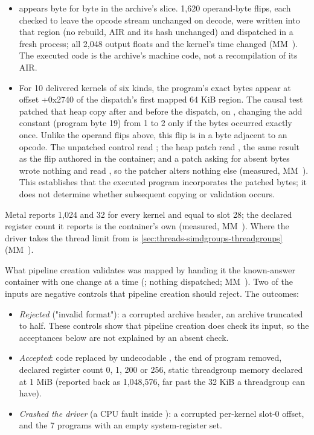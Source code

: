 \begin{itemize}
\item {} appears byte for byte in the archive's  slice. 1,620 operand-byte flips, each checked to
  leave the opcode stream unchanged on decode, were written into that region (no rebuild, AIR and its hash unchanged) and
  dispatched in a fresh process; all 2,048 output floats and the kernel's time changed (MM~). The executed code
  is the archive's machine code, not a recompilation of its AIR.
\item For 10 delivered kernels of six kinds, the program's exact bytes appear at offset +0x2740 of the dispatch's first
  mapped 64 KiB region. The causal test patched that heap copy after  and before the dispatch,
  on , changing the add constant (program byte 19) from 1 to 2 only if the bytes occurred exactly once.
  Unlike the operand flips above, this flip is in a byte adjacent to an opcode.
  The unpatched control read ; the heap patch read , the same result as the flip authored in the
  container; and a patch asking for absent bytes wrote nothing and read , so the patcher alters nothing else
  (measured, MM~). This establishes that the executed program incorporates the patched bytes; it does not determine
  whether subsequent copying or validation occurs.
\end{itemize}

Metal reports  1,024 and  32 for every kernel and
 equal to slot 28; the declared register count it reports is the container's own
(measured, MM~). Where the driver takes the thread limit from is \cref{sec:threads-simdgroups-threadgroups} (MM~).

What pipeline creation validates was mapped by handing it the known-answer container with one change at a time
(; nothing dispatched; MM~). Two of the inputs are negative controls that
pipeline creation should reject. The outcomes:

\begin{itemize}
\item \emph{Rejected} ("invalid format"): a corrupted archive header, an archive truncated to half. These controls show that
  pipeline creation does check its input, so the acceptances below are not explained by an absent check.
\item \emph{Accepted}: code replaced by undecodable , the end of program removed, declared register count 0, 1, 200 or 256,
  static threadgroup memory declared at 1 MiB (reported back as 1,048,576, far past the 32 KiB a threadgroup can have).
\item \emph{Crashed the driver} (a CPU fault inside ): a corrupted per-kernel slot-0 offset, and the 7
  programs with an empty system-register set.
\end{itemize}

